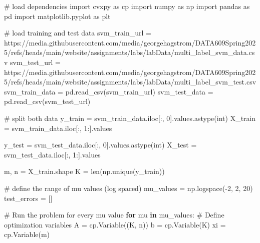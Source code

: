 \documentclass[
  letterpaper,
  DIV=11,
  numbers=noendperiod]{scrartcl}
\newenvironment{Shaded}{\begin{snugshade}}{\end{snugshade}}
\newcommand{\BuiltInTok}[1]{\textcolor[rgb]{0.00,0.23,0.31}{#1}}
\newcommand{\CommentTok}[1]{\textcolor[rgb]{0.37,0.37,0.37}{#1}}
\newcommand{\ControlFlowTok}[1]{\textcolor[rgb]{0.00,0.23,0.31}{\textbf{#1}}}
\newcommand{\DecValTok}[1]{\textcolor[rgb]{0.68,0.00,0.00}{#1}}
\newcommand{\ImportTok}[1]{\textcolor[rgb]{0.00,0.46,0.62}{#1}}
\newcommand{\KeywordTok}[1]{\textcolor[rgb]{0.00,0.23,0.31}{\textbf{#1}}}
\newcommand{\NormalTok}[1]{\textcolor[rgb]{0.00,0.23,0.31}{#1}}
\newcommand{\OperatorTok}[1]{\textcolor[rgb]{0.37,0.37,0.37}{#1}}
\newcommand{\StringTok}[1]{\textcolor[rgb]{0.13,0.47,0.30}{#1}}
\begin{document}
\begin{Shaded}
\begin{Highlighting}[]
\CommentTok{\# load dependencies}
\ImportTok{import}\NormalTok{ cvxpy }\ImportTok{as}\NormalTok{ cp}
\ImportTok{import}\NormalTok{ numpy }\ImportTok{as}\NormalTok{ np}
\ImportTok{import}\NormalTok{ pandas }\ImportTok{as}\NormalTok{ pd}
\ImportTok{import}\NormalTok{ matplotlib.pyplot }\ImportTok{as}\NormalTok{ plt}

\CommentTok{\# load training and test data}
\NormalTok{svm\_train\_url }\OperatorTok{=} \StringTok{\textquotesingle{}https://media.githubusercontent.com/media/georgehagstrom/DATA609Spring2025/refs/heads/main/website/assignments/labs/labData/multi\_label\_svm\_data.csv\textquotesingle{}}
\NormalTok{svm\_test\_url }\OperatorTok{=} \StringTok{\textquotesingle{}https://media.githubusercontent.com/media/georgehagstrom/DATA609Spring2025/refs/heads/main/website/assignments/labs/labData/multi\_label\_svm\_test.csv\textquotesingle{}}
\NormalTok{svm\_train\_data }\OperatorTok{=}\NormalTok{ pd.read\_csv(svm\_train\_url)}
\NormalTok{svm\_test\_data  }\OperatorTok{=}\NormalTok{ pd.read\_csv(svm\_test\_url)}

\CommentTok{\# split both data}
\NormalTok{y\_train }\OperatorTok{=}\NormalTok{ svm\_train\_data.iloc[:, }\DecValTok{0}\NormalTok{].values.astype(}\BuiltInTok{int}\NormalTok{)}
\NormalTok{X\_train }\OperatorTok{=}\NormalTok{ svm\_train\_data.iloc[:, }\DecValTok{1}\NormalTok{:].values}

\NormalTok{y\_test }\OperatorTok{=}\NormalTok{ svm\_test\_data.iloc[:, }\DecValTok{0}\NormalTok{].values.astype(}\BuiltInTok{int}\NormalTok{)}
\NormalTok{X\_test }\OperatorTok{=}\NormalTok{ svm\_test\_data.iloc[:, }\DecValTok{1}\NormalTok{:].values}

\NormalTok{m, n }\OperatorTok{=}\NormalTok{ X\_train.shape}
\NormalTok{K }\OperatorTok{=} \BuiltInTok{len}\NormalTok{(np.unique(y\_train))}

\CommentTok{\# define the range of mu values (log spaced)}
\NormalTok{mu\_values }\OperatorTok{=}\NormalTok{ np.logspace(}\OperatorTok{{-}}\DecValTok{2}\NormalTok{, }\DecValTok{2}\NormalTok{, }\DecValTok{20}\NormalTok{)}
\NormalTok{test\_errors }\OperatorTok{=}\NormalTok{ []}

\CommentTok{\# Run the problem for every mu value}
\ControlFlowTok{for}\NormalTok{ mu }\KeywordTok{in}\NormalTok{ mu\_values:}
    \CommentTok{\# Define optimization variables}
\NormalTok{    A }\OperatorTok{=}\NormalTok{ cp.Variable((K, n))}
\NormalTok{    b }\OperatorTok{=}\NormalTok{ cp.Variable(K)}
\NormalTok{    xi }\OperatorTok{=}\NormalTok{ cp.Variable(m)}


\end{Highlighting}
\end{Shaded}
\end{document}

